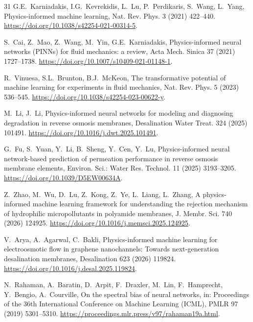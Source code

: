 \documentclass[3p,preprint,12pt,numbers,square,sort&compress]{elsarticle}
\begin{document}
\begin{thebibliography}{31}
G.E.~Karniadakis, I.G.~Kevrekidis, L.~Lu, P.~Perdikaris, S.~Wang, L.~Yang, Physics-informed machine learning, Nat. Rev. Phys. 3 (2021) 422--440. \href{https://doi.org/10.1038/s42254-021-00314-5}{https://doi.org/10.1038/s42254-021-00314-5}.

S.~Cai, Z.~Mao, Z.~Wang, M.~Yin, G.E.~Karniadakis, Physics-informed neural networks (PINNs) for fluid mechanics: a review, Acta Mech. Sinica 37 (2021) 1727--1738. \href{https://doi.org/10.1007/s10409-021-01148-1}{https://doi.org/10.1007/s10409-021-01148-1}.

R.~Vinuesa, S.L.~Brunton, B.J.~McKeon, The transformative potential of machine learning for experiments in fluid mechanics, Nat. Rev. Phys. 5 (2023) 536--545. \href{https://doi.org/10.1038/s42254-023-00622-y}{https://doi.org/10.1038/s42254-023-00622-y}.

M.~Li, J.~Li, Physics-informed neural networks for modeling and diagnosing degradation in reverse osmosis membranes, Desalination Water Treat. 324 (2025) 101491. \href{https://doi.org/10.1016/j.dwt.2025.101491}{https://doi.org/10.1016/j.dwt.2025.101491}.

G.~Fu, S.~Yuan, Y.~Li, B.~Sheng, Y.~Cen, Y.~Lu, Physics-informed neural network-based prediction of permeation performance in reverse osmosis membrane elements, Environ. Sci.: Water Res. Technol. 11 (2025) 3193--3205. \href{https://doi.org/10.1039/D5EW00634A}{https://doi.org/10.1039/D5EW00634A}.

Z.~Zhao, M.~Wu, D.~Lu, Z.~Kong, Z.~Ye, L.~Liang, L.~Zhang, A physics-informed machine learning framework for understanding the rejection mechanism of hydrophilic micropollutants in polyamide membranes, J. Membr. Sci. 740 (2026) 124925. \href{https://doi.org/10.1016/j.memsci.2025.124925}{https://doi.org/10.1016/j.memsci.2025.124925}.

V.~Arya, A.~Agarwal, C.~Bakli, Physics-informed machine learning for electroosmotic flow in graphene nanochannels: Towards next-generation desalination membranes, Desalination 623 (2026) 119824. \href{https://doi.org/10.1016/j.desal.2025.119824}{https://doi.org/10.1016/j.desal.2025.119824}.

N.~Rahaman, A.~Baratin, D.~Arpit, F.~Draxler, M.~Lin, F.~Hamprecht, Y.~Bengio, A.~Courville, On the spectral bias of neural networks, in: Proceedings of the 36th International Conference on Machine Learning (ICML), PMLR 97 (2019) 5301--5310. \href{https://proceedings.mlr.press/v97/rahaman19a.html}{https://proceedings.mlr.press/v97/rahaman19a.html}.


\end{thebibliography}
\end{document}
